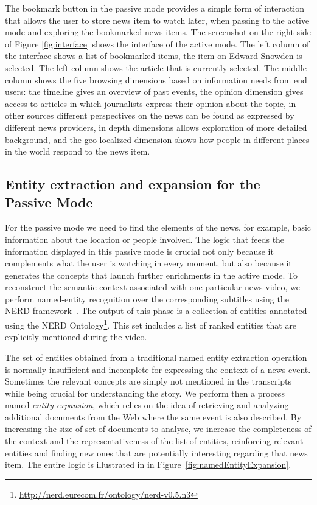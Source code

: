 \documentclass{llncs}
\begin{document}

The bookmark button in the passive mode provides a simple form of interaction that allows the user to store news item to watch later, when passing to the active mode and exploring the bookmarked news items. The screenshot on the right side of Figure \ref{fig:interface} shows the interface of the active mode. The left column of the interface shows a list of bookmarked items, the item on Edward Snowden is selected. The left column shows the article that is currently selected. The middle column shows the five browsing dimensions based on information needs from end users: the timeline gives an overview of past events, the opinion dimension gives access to articles in which journalists express their opinion about the topic, in other sources different perspectives on the news can be found as expressed by different news providers, in depth dimensions allows exploration of more detailed background, and the geo-localized dimension shows how people in different places in the world respond to the news item. 

\subsection{Entity extraction and expansion for the Passive Mode}
\label{sec:leanbackmode}

For  the passive mode we need to find the elements of the news, for example, basic information about the location or people involved. The logic that feeds the information displayed in this passive mode is crucial not only because it complements what the user is watching in every moment, but also because it generates the concepts that launch further enrichments in the active mode. To reconstruct the semantic context associated with one particular news video, we perform named-entity recognition over the corresponding subtitles using the NERD framework~\cite{Rizzo2012b}. The output of this phase is a collection of entities annotated using the NERD Ontology\footnote{\fontsize{8pt}{1em}\selectfont \url{http://nerd.eurecom.fr/ontology/nerd-v0.5.n3}}. This set includes a list of ranked entities that are explicitly mentioned during the video.

The set of entities obtained from a traditional named entity extraction operation is normally insufficient and incomplete for expressing the context of a news event. Sometimes the relevant concepts are simply not mentioned in the transcripts while being crucial for understanding the story. We perform then a process named \emph{entity expansion}, which relies on the idea of retrieving and analyzing additional documents from the Web where the same event is also described. By increasing the size of set of documents to analyse, we increase the completeness of the context and the representativeness of the list of entities, reinforcing relevant entities and finding new ones that are potentially interesting regarding that news item. The entire logic is illustrated in in Figure~\ref{fig:namedEntityExpansion}.
\end{document}
